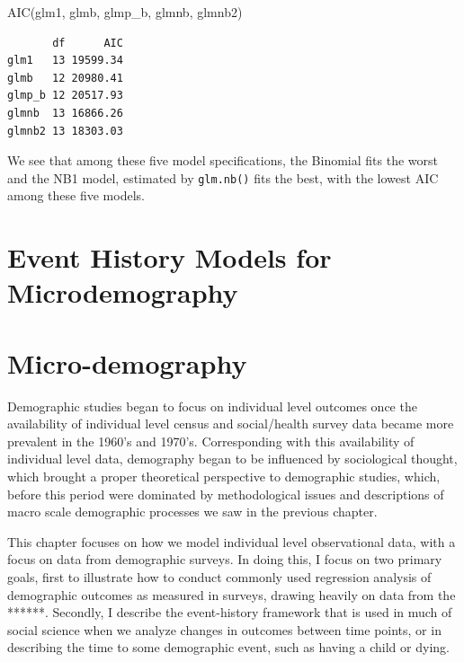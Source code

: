 \documentclass[
  letterpaper,
  DIV=11,
  numbers=noendperiod]{scrreprt}
\newenvironment{Shaded}{\begin{snugshade}}{\end{snugshade}}
\newcommand{\FunctionTok}[1]{\textcolor[rgb]{0.28,0.35,0.67}{#1}}
\newcommand{\NormalTok}[1]{\textcolor[rgb]{0.00,0.23,0.31}{#1}}
\begin{document}
\begin{Shaded}
\begin{Highlighting}[]
\FunctionTok{AIC}\NormalTok{(glm1, glmb, glmp\_b, glmnb, glmnb2)}
\end{Highlighting}
\end{Shaded}

\begin{verbatim}
       df      AIC
glm1   13 19599.34
glmb   12 20980.41
glmp_b 12 20517.93
glmnb  13 16866.26
glmnb2 13 18303.03
\end{verbatim}

We see that among these five model specifications, the Binomial fits the
worst and the NB1 model, estimated by \texttt{glm.nb()} fits the best,
with the lowest AIC among these five models.


\hypertarget{event-history-models-for-microdemography}{%
\chapter{Event History Models for
Microdemography}\label{event-history-models-for-microdemography}}

\newpage


\hypertarget{micro-demography}{%
\chapter{Micro-demography}\label{micro-demography}}

Demographic studies began to focus on individual level outcomes once the
availability of individual level census and social/health survey data
became more prevalent in the 1960's and 1970's. Corresponding with this
availability of individual level data, demography began to be influenced
by sociological thought, which brought a proper theoretical perspective
to demographic studies, which, before this period were dominated by
methodological issues and descriptions of macro scale demographic
processes we saw in the previous chapter.

This chapter focuses on how we model individual level observational
data, with a focus on data from demographic surveys. In doing this, I
focus on two primary goals, first to illustrate how to conduct commonly
used regression analysis of demographic outcomes as measured in surveys,
drawing heavily on data from the ******. Secondly, I describe the
event-history framework that is used in much of social science when we
analyze changes in outcomes between time points, or in describing the
time to some demographic event, such as having a child or dying.
\end{document}
